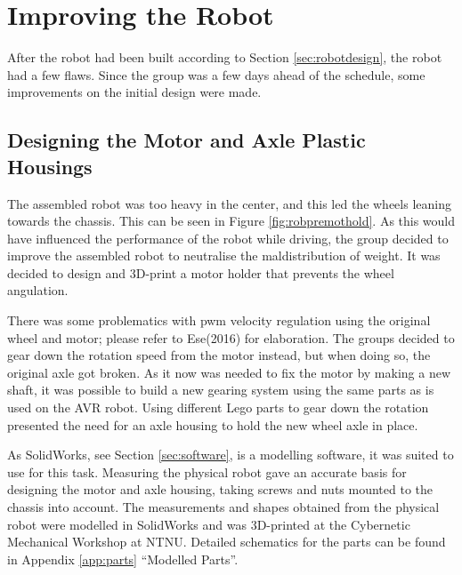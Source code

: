 \section{Improving the Robot}
\label{sec:improvements}
After the robot had been built according to Section \ref{sec:robotdesign}, the robot had a few flaws. Since the group was a few days ahead of the schedule, some improvements on the initial design were made.

\subsection{Designing the Motor and Axle Plastic Housings}
\label{sec:motoraxle}
The assembled robot was too heavy in the center, and this led the wheels leaning towards the chassis. This can be seen in Figure \ref{fig:robpremothold}.  As this would have influenced the performance of the robot while driving, the group decided to improve the assembled robot to neutralise the maldistribution of weight. It was decided to design and 3D-print a motor holder that prevents the wheel angulation.

There was some problematics with \acrshort{pwm} velocity regulation using the original wheel and motor; please refer to Ese(2016) for elaboration. The groups decided to gear down the rotation speed from the motor instead, but when doing so, the original axle got broken. As it now was needed to fix the motor by making a new shaft, it was possible to build a new gearing system using the same parts as is used on the AVR robot. Using different Lego parts to gear down the rotation presented the need for an axle housing to hold the new wheel axle in place.

As SolidWorks, see Section \ref{sec:software}, is a modelling software, it was suited to use for this task. Measuring the physical robot gave an accurate basis for designing the motor and axle housing, taking screws and nuts mounted to the chassis into account. The measurements and shapes obtained from the physical robot were modelled in SolidWorks and was 3D-printed at the Cybernetic Mechanical Workshop at NTNU. Detailed schematics for the parts can be found in Appendix \ref{app:parts} ``Modelled Parts''. 


